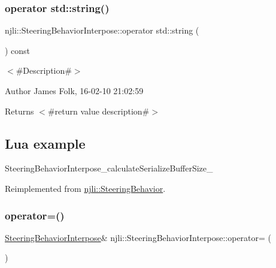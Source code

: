 \subsubsection{\texorpdfstring{operator std\+::string()}{operator std::string()}}
{\footnotesize\ttfamily njli\+::\+Steering\+Behavior\+Interpose\+::operator std\+::string (\begin{DoxyParamCaption}{ }\end{DoxyParamCaption}) const\hspace{0.3cm}{\ttfamily [virtual]}}



$<$\#\+Description\#$>$ 

\begin{DoxyAuthor}{Author}
James Folk, 16-\/02-\/10 21\+:02\+:59
\end{DoxyAuthor}
\begin{DoxyReturn}{Returns}
$<$\#return value description\#$>$
\end{DoxyReturn}
\hypertarget{classnjli_1_1_steering_behavior_wander_ex1}{}\subsection{Lua example}\label{classnjli_1_1_steering_behavior_wander_ex1}

\begin{DoxyCodeInclude}
\end{DoxyCodeInclude}
Steering\+Behavior\+Interpose\+\_\+calculate\+Serialize\+Buffer\+Size\+\_\+ 

Reimplemented from \mbox{\hyperlink{classnjli_1_1_steering_behavior_acd7af46e42a8a3fc1208a47f50836ac8}{njli\+::\+Steering\+Behavior}}.

\mbox{\label{classnjli_1_1_steering_behavior_interpose_ad0ab9efa14f816cb0f21507445c85069}} 
\subsubsection{\texorpdfstring{operator=()}{operator=()}}
{\footnotesize\ttfamily \mbox{\hyperlink{classnjli_1_1_steering_behavior_interpose}{Steering\+Behavior\+Interpose}}\& njli\+::\+Steering\+Behavior\+Interpose\+::operator= (\begin{DoxyParamCaption}\item[{const \mbox{\hyperlink{classnjli_1_1_steering_behavior_interpose}{Steering\+Behavior\+Interpose}} \&}]{ }\end{DoxyParamCaption})\hspace{0.3cm}{\ttfamily [protected]}}

